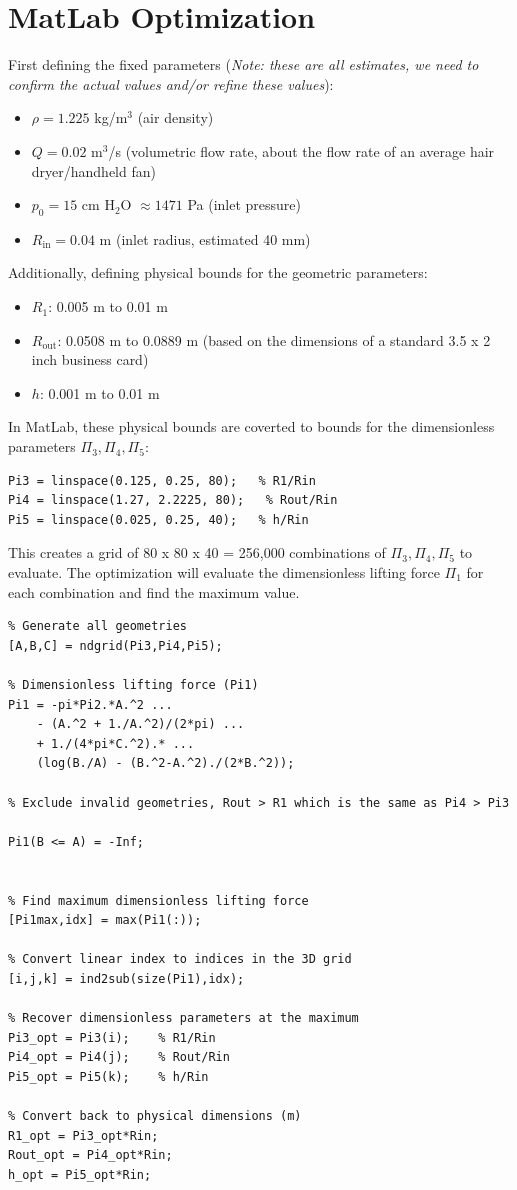 \documentclass[11pt]{article}
\begin{document}
\section*{MatLab Optimization}
First defining the fixed parameters (\textit{Note: these are all estimates, we need to confirm the actual values and/or refine these values}):
\begin{itemize}
    \item $\rho = 1.225$ kg/m$^3$ (air density)
    \item $Q = 0.02$ m$^3$/s (volumetric flow rate, about the flow rate of an average hair dryer/handheld fan)
    \item $p_0 = 15$ cm H$_2$O $\approx 1471$ Pa (inlet pressure)
    \item $R_\text{in} = 0.04$ m (inlet radius, estimated 40 mm)
\end{itemize}
Additionally, defining physical bounds for the geometric parameters:
\begin{itemize}
    \item $R_1$: 0.005 m to 0.01 m
    \item $R_\text{out}$: 0.0508 m to 0.0889 m (based on the dimensions of a standard 3.5 x 2 inch business card)
    \item $h$: 0.001 m to 0.01 m
\end{itemize}
In MatLab, these physical bounds are coverted to bounds for the dimensionless parameters $\Pi_3, \Pi_4, \Pi_5$:
\begin{lstlisting}
Pi3 = linspace(0.125, 0.25, 80);   % R1/Rin
Pi4 = linspace(1.27, 2.2225, 80);   % Rout/Rin
Pi5 = linspace(0.025, 0.25, 40);   % h/Rin
\end{lstlisting}
This creates a grid of 80 x 80 x 40 = 256,000 combinations of $\Pi_3, \Pi_4, \Pi_5$ to evaluate. The optimization will evaluate the dimensionless lifting force $\Pi_1$ for each combination and find the maximum value.
\begin{lstlisting}
% Generate all geometries
[A,B,C] = ndgrid(Pi3,Pi4,Pi5);

% Dimensionless lifting force (Pi1)
Pi1 = -pi*Pi2.*A.^2 ...
    - (A.^2 + 1./A.^2)/(2*pi) ...
    + 1./(4*pi*C.^2).* ...
    (log(B./A) - (B.^2-A.^2)./(2*B.^2));

% Exclude invalid geometries, Rout > R1 which is the same as Pi4 > Pi3

Pi1(B <= A) = -Inf;


% Find maximum dimensionless lifting force
[Pi1max,idx] = max(Pi1(:));

% Convert linear index to indices in the 3D grid
[i,j,k] = ind2sub(size(Pi1),idx);

% Recover dimensionless parameters at the maximum
Pi3_opt = Pi3(i);    % R1/Rin
Pi4_opt = Pi4(j);    % Rout/Rin
Pi5_opt = Pi5(k);    % h/Rin

% Convert back to physical dimensions (m)
R1_opt = Pi3_opt*Rin;
Rout_opt = Pi4_opt*Rin;
h_opt = Pi5_opt*Rin;
\end{lstlisting}
\end{document}
